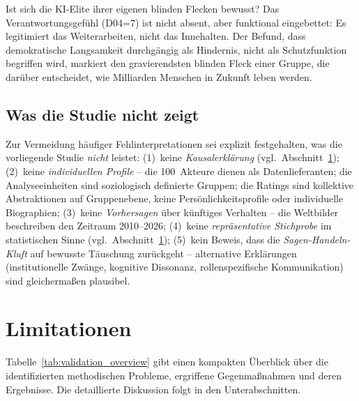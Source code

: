 \documentclass[12pt,a4paper]{article}
\begin{document}
Ist sich die KI-Elite ihrer eigenen blinden Flecken bewusst? Das Verantwortungsgefühl (D04=7) ist nicht absent, aber funktional eingebettet: Es legitimiert das Weiterarbeiten, nicht das Innehalten. Der Befund, dass demokratische Langsamkeit durchgängig als Hindernis, nicht als Schutzfunktion begriffen wird, markiert den gravierendsten blinden Fleck einer Gruppe, die darüber entscheidet, wie Milliarden Menschen in Zukunft leben werden.


\subsection{Was die Studie nicht zeigt}
\label{sec:diskussion:negativ}

Zur Vermeidung häufiger Fehlinterpretationen sei explizit festgehalten, was die vorliegende Studie \emph{nicht} leistet: (1)~keine \emph{Kausalerklärung} (vgl.\ Abschnitt~\ref{sec:limitationen}); (2)~keine \emph{individuellen Profile} -- die 100~Akteure dienen als Datenlieferanten; die Analyseeinheiten sind soziologisch definierte Gruppen; die Ratings sind kollektive Abstraktionen auf Gruppenebene, keine Persönlichkeitsprofile oder individuelle Biographien; (3)~keine \emph{Vorhersagen} über künftiges Verhalten -- die Weltbilder beschreiben den Zeitraum 2010--2026; (4)~keine \emph{repräsentative Stichprobe} im statistischen Sinne (vgl.\ Abschnitt~\ref{sec:limitationen}); (5)~kein Beweis, dass die \emph{Sagen-Handeln-Kluft} auf bewusste Täuschung zurückgeht -- alternative Erklärungen (institutionelle Zwänge, kognitive Dissonanz, rollenspezifische Kommunikation) sind gleichermaßen plausibel.


\section{Limitationen}
\label{sec:limitationen}

Tabelle~\ref{tab:validation_overview} gibt einen kompakten Überblick über die identifizierten methodischen Probleme, ergriffene Gegenmaßnahmen und deren Ergebnisse. Die detaillierte Diskussion folgt in den Unterabschnitten.
\end{document}
